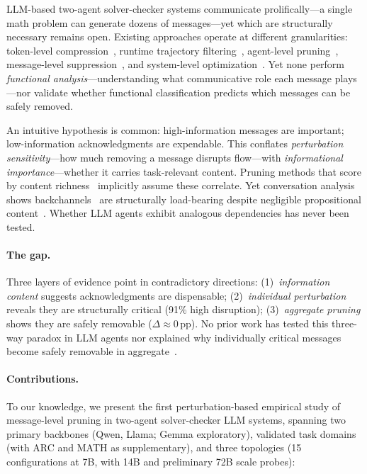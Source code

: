 LLM-based two-agent solver-checker systems communicate prolifically---a single math problem can generate dozens of messages---yet which are structurally necessary remains open. Existing approaches operate at different granularities: token-level compression~\cite{jiang_llmlingua_2023, chevalier_autocompressors_2023}, runtime trajectory filtering~\cite{lin_supervisoragent_2026}, agent-level pruning~\cite{wang_agentdropout_2025, zhang_agentprune_2025}, message-level suppression~\cite{li_agp_2025, zeng_s2mad_2025}, and system-level optimization~\cite{chen_optima_2025}. Yet none perform \emph{functional analysis}---understanding what communicative role each message plays---nor validate whether functional classification predicts which messages can be safely removed.

An intuitive hypothesis is common: high-information messages are important; low-information acknowledgments are expendable. This conflates \emph{perturbation sensitivity}---how much removing a message disrupts flow---with \emph{informational importance}---whether it carries task-relevant content. Pruning methods that score by content richness~\cite{wang_agentdropout_2025, zeng_s2mad_2025} implicitly assume these correlate. Yet conversation analysis shows backchannels~\cite{yngve_getting_1970, schegloff_discourse_1982, jefferson_acknowledgment_1984} are structurally load-bearing despite negligible propositional content~\cite{clark_contributing_1989}. Whether LLM agents exhibit analogous dependencies has never been tested.

\paragraph{The gap.} Three layers of evidence point in contradictory directions: (1)~\emph{information content} suggests acknowledgments are dispensable; (2)~\emph{individual perturbation} reveals they are structurally critical (91\% high disruption); (3)~\emph{aggregate pruning} shows they are safely removable ($\Delta \approx 0$\,pp). No prior work has tested this three-way paradox in LLM agents nor explained why individually critical messages become safely removable in aggregate~\cite{rizvi_martel_communication_2026}.

\paragraph{Contributions.} To our knowledge, we present the first perturbation-based empirical study of message-level pruning in two-agent solver-checker LLM systems, spanning two primary backbones (Qwen, Llama; Gemma exploratory), \numValidatedDomains{} validated task domains (with ARC and MATH as supplementary), and three topologies (15 configurations at 7B, with 14B and preliminary 72B scale probes):

